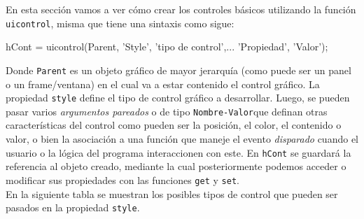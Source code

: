 En esta sección vamos a ver cómo crear los controles básicos utilizando
la función \texttt{uicontrol}, misma que tiene una sintaxis como sigue:

\begin{matlab}
hCont = uicontrol(Parent, 'Style', 'tipo de control',...
                  'Propiedad', 'Valor');
\end{matlab}

Donde \texttt{Parent} es un objeto gráfico de mayor jerarquía (como
puede ser un panel o un frame/ventana) en el cual va a estar contenido
el control gráfico. La propiedad \texttt{style} define el tipo de
control gráfico a desarrollar. Luego, se pueden pasar varios
\emph{argumentos pareados} o de tipo \texttt{Nombre-Valor}que definan
otras características del control como pueden ser la posición, el color,
el contenido o valor, o bien la asociación a una función que maneje el
evento \emph{disparado} cuando el usuario o la lógica del programa
interaccionen con este. En \texttt{hCont} se guardará la referencia al
objeto creado, mediante la cual posteriormente podemos acceder o
modificar sus propiedades con las funciones \texttt{get} y \texttt{set}. \\ 

En la siguiente tabla se muestran los posibles tipos de control que
pueden ser pasados en la propiedad \texttt{style}.

